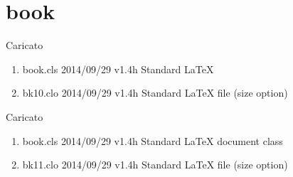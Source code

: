 \section{book}

Caricato 
\begin{enumerate}
\item book.cls 2014/09/29 v1.4h Standard LaTeX 
\item bk10.clo 2014/09/29 v1.4h Standard LaTeX file (size option)
\end{enumerate}

Caricato 
\begin{enumerate}
\item book.cls 2014/09/29 v1.4h Standard LaTeX document class
\item bk11.clo 2014/09/29 v1.4h Standard LaTeX file (size option)
\end{enumerate}
